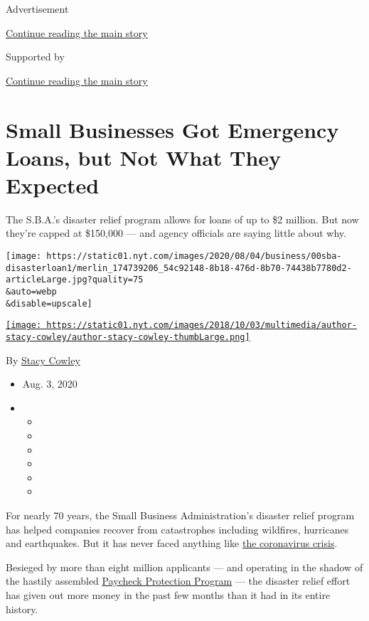 Advertisement

\protect\hyperlink{after-top}{Continue reading the main story}

Supported by

\protect\hyperlink{after-sponsor}{Continue reading the main story}

\hypertarget{small-businesses-got-emergency-loans-but-not-what-they-expected}{%
\section{Small Businesses Got Emergency Loans, but Not What They
Expected}\label{small-businesses-got-emergency-loans-but-not-what-they-expected}}

The S.B.A.'s disaster relief program allows for loans of up to \$2
million. But now they're capped at \$150,000 --- and agency officials
are saying little about why.

\texttt{[image: https://static01.nyt.com/images/2020/08/04/business/00sba-disasterloan1/merlin\_174739206\_54c92148-8b18-476d-8b70-74438b7780d2-articleLarge.jpg?quality=75\\\&auto=webp\\\&disable=upscale]}

\href{https://www.nytimes.com/by/stacy-cowley}{\texttt{[image: https://static01.nyt.com/images/2018/10/03/multimedia/author-stacy-cowley/author-stacy-cowley-thumbLarge.png]}}

By \href{https://www.nytimes.com/by/stacy-cowley}{Stacy Cowley}

\begin{itemize}
\item
  Aug. 3, 2020
\item
  \begin{itemize}
  \item
  \item
  \item
  \item
  \item
  \item
  \end{itemize}
\end{itemize}

For nearly 70 years, the Small Business Administration's disaster relief
program has helped companies recover from catastrophes including
wildfires, hurricanes and earthquakes. But it has never faced anything
like \href{https://www.nytimes.com/news-event/coronavirus}{the
coronavirus crisis}.

Besieged by more than eight million applicants --- and operating in the
shadow of the hastily assembled
\href{https://www.nytimes.com/2020/04/26/business/ppp-small-business-loans.html}{Paycheck
Protection Program} --- the disaster relief effort has given out more
money in the past few months than it had in its entire history.

